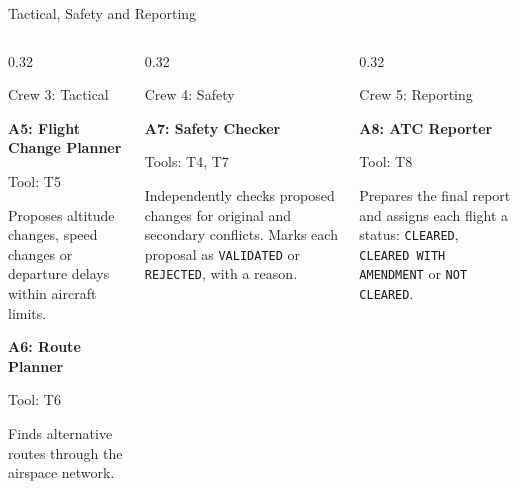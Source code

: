 

\begin{frame}{Tactical, Safety and Reporting}

\begin{columns}[T,onlytextwidth]

\begin{column}{0.32\textwidth}
\begin{block}{Crew 3: Tactical}
\scriptsize

\textbf{A5: Flight Change Planner}

\vspace{0.15cm}
Tool: T5

\vspace{0.1cm}
Proposes altitude changes, speed changes or departure delays within aircraft limits.

\vspace{0.3cm}

\textbf{A6: Route Planner}

\vspace{0.15cm}
Tool: T6

\vspace{0.1cm}
Finds alternative routes through the airspace network.

\end{block}
\end{column}

\begin{column}{0.32\textwidth}
\begin{block}{Crew 4: Safety}
\scriptsize

\textbf{A7: Safety Checker}

\vspace{0.15cm}
Tools: T4, T7

\vspace{0.2cm}
Independently checks proposed changes for original and secondary conflicts. Marks each proposal as \texttt{VALIDATED} or \texttt{REJECTED}, with a reason.

\end{block}
\end{column}

\begin{column}{0.32\textwidth}
\begin{block}{Crew 5: Reporting}
\scriptsize

\textbf{A8: ATC Reporter}

\vspace{0.15cm}
Tool: T8

\vspace{0.2cm}
Prepares the final report and assigns each flight a status:
\texttt{CLEARED},
\texttt{CLEARED WITH AMENDMENT}
or \texttt{NOT CLEARED}.


\end{block}
\end{column}
\end{columns}
\end{frame}

